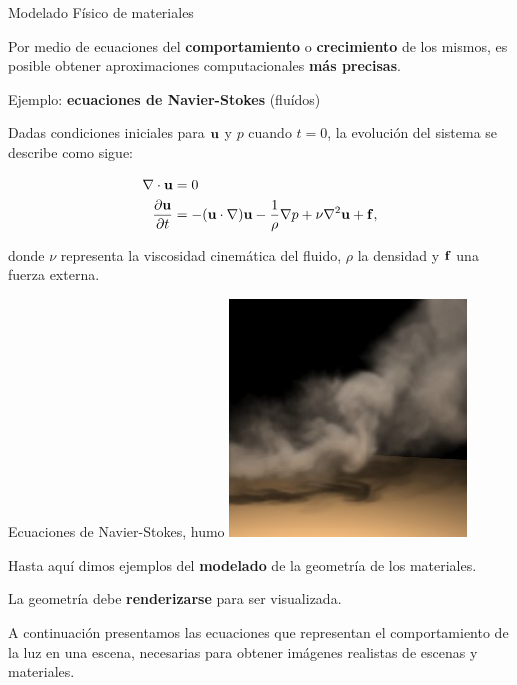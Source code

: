 \documentclass[spanish]{beamer}
\begin{document}
\begin{frame}{Modelado Físico de materiales}

Por medio de ecuaciones del \textbf{comportamiento} o \textbf{crecimiento} de los mismos, es posible obtener aproximaciones computacionales \textbf{más precisas}.

Ejemplo: \textbf{ecuaciones de Navier-Stokes} (fluídos)

Dadas condiciones iniciales para $\bold{u}$ y $p$ cuando $t = 0$, la evolución del sistema se describe como sigue:

\begin{align*}
\nabla \cdot \bold{u} &= 0\\
\frac{\partial \bold{u} }{\partial t} &= - (\bold{u} \cdot \nabla) \bold{u} - \frac{1}{\rho} \nabla p + \nu \nabla^{2} \bold{u} + \bold{f},
\end{align*}

\noindent donde $\nu$ representa la viscosidad cinemática del fluido, $\rho$ la densidad y $\bold{f}$ una fuerza externa.

\end{frame}

\begin{frame}{Ecuaciones de Navier-Stokes, humo}
\center
\includegraphics[width=6.3cm]{../figures/smoke}

\end{frame}

\begin{frame}

Hasta aquí dimos ejemplos del \textbf{modelado} de la geometría de los materiales.

\vspace{0.5cm}
La geometría debe \textbf{renderizarse} para ser visualizada.
\vspace{0.5cm}

A continuación presentamos las ecuaciones que representan el comportamiento de la luz en una escena, necesarias para obtener imágenes realistas de escenas y materiales.

\end{frame}
\end{document}
